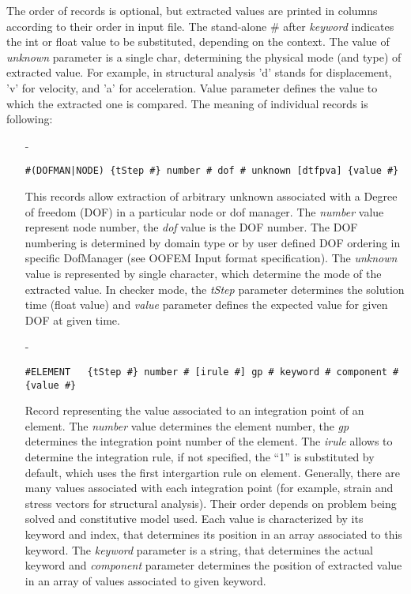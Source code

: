 \documentclass[a4paper]{article}
\begin{document}
The order of records is optional, but extracted values are printed in
columns according to their order in input file. The stand-alone \#
after {\em keyword} indicates the int or float value to be substituted, depending on the context. The value of {\em
unknown} parameter is a single char, determining the physical mode (and type) of extracted value.
For example, in structural analysis 'd' stands for displacement, 'v' for velocity, and 'a' for acceleration.
Value parameter defines the value to which the extracted one is compared.  
The meaning of individual records is following:
\begin{itemize}
\item[-]
\begin{verbatim}
#(DOFMAN|NODE) {tStep #} number # dof # unknown [dtfpva] {value #}
\end{verbatim}
This records allow extraction of arbitrary unknown associated with
a Degree of freedom (DOF) in a particular node or dof manager.
The {\em number} value represent node number, the {\em
dof} value is the DOF number. The DOF numbering is determined
by domain type or by user defined DOF ordering in specific
DofManager (see OOFEM Input format specification). The {\em unknown} value
is represented by single character, which determine the mode of the
extracted value. In checker mode, the {\em tStep} parameter determines the solution time (float value) and {\em value} parameter defines the expected value for given DOF at given time.


\item[-]
\begin{verbatim}
#ELEMENT   {tStep #} number # [irule #] gp # keyword # component # {value #}
\end{verbatim}
Record representing the value associated to an integration point of
an element. The {\em number} value determines the element number, the {\em
gp} determines the integration point number of the element. The {\em irule} allows to determine the integration rule, if not specified, the ``1'' is substituted by default, which uses the first intergartion rule on element.
Generally, there are many values associated with each integration point 
(for example, strain and stress vectors for structural
analysis). Their order depends on problem being solved and
constitutive model used. Each value is characterized by its keyword and index, 
that determines its position in an array associated to this keyword.
The {\em keyword} parameter is a string, that determines the actual keyword
and {\em component} parameter determines the position of extracted value in an 
array of values associated to given keyword.


\end{itemize}
\end{document}
